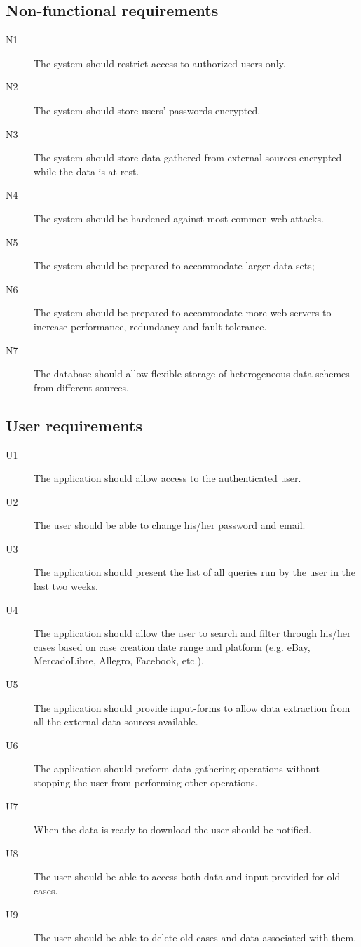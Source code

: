 \subsection{Non-functional requirements}

\begin{description}
  \item[N1] The system should restrict access to authorized users only.
  \item[N2] The system should store users' passwords encrypted.
  \item[N3] The system should store data gathered from external sources
  encrypted while the data is at rest.
  \item[N4] The system should be hardened against most common web attacks.
  \item[N5] The system should be prepared to accommodate larger data
  sets;
  \item[N6] The system should be prepared to accommodate more web servers to
  increase performance, redundancy and fault-tolerance.
  \item[N7] The database should allow flexible storage of heterogeneous
  data-schemes from different sources.
\end{description}

\subsection{User requirements}
\begin{description}
\item[U1] The application should allow access to the authenticated user.
\item[U2] The user should be able to change his/her password and email.
\item[U3] The application should present the list of all queries run by the user
in the last two weeks.
\item[U4] The application should allow the user to search and filter through
his/her cases based on case creation date range and platform (e.g. eBay,
MercadoLibre, Allegro, Facebook, etc.).
\item[U5] The application should provide input-forms to allow data extraction
from all the external data sources available.
\item[U6] The application should preform data gathering operations without
stopping the user from performing other operations.
\item[U7] When the data is ready to download the user should be notified.
\item[U8] The user should be able to access both data and input provided for old
cases.
\item[U9] The user should be able to delete old cases and data associated with
them.
\end{description}


